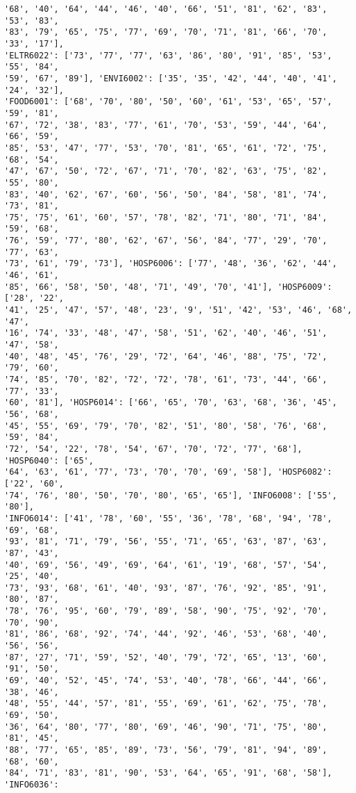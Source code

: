 \documentclass[11pt]{article}
\begin{document}
\begin{Verbatim}[commandchars=\\\{\}]
'68', '40', '64', '44', '46', '40', '66', '51', '81', '62', '83', '53', '83',
'83', '79', '65', '75', '77', '69', '70', '71', '81', '66', '70', '33', '17'],
'ELTR6022': ['73', '77', '77', '63', '86', '80', '91', '85', '53', '55', '84',
'59', '67', '89'], 'ENVI6002': ['35', '35', '42', '44', '40', '41', '24', '32'],
'FOOD6001': ['68', '70', '80', '50', '60', '61', '53', '65', '57', '59', '81',
'67', '72', '38', '83', '77', '61', '70', '53', '59', '44', '64', '66', '59',
'85', '53', '47', '77', '53', '70', '81', '65', '61', '72', '75', '68', '54',
'47', '67', '50', '72', '67', '71', '70', '82', '63', '75', '82', '55', '80',
'83', '40', '62', '67', '60', '56', '50', '84', '58', '81', '74', '73', '81',
'75', '75', '61', '60', '57', '78', '82', '71', '80', '71', '84', '59', '68',
'76', '59', '77', '80', '62', '67', '56', '84', '77', '29', '70', '77', '63',
'73', '61', '79', '73'], 'HOSP6006': ['77', '48', '36', '62', '44', '46', '61',
'85', '66', '58', '50', '48', '71', '49', '70', '41'], 'HOSP6009': ['28', '22',
'41', '25', '47', '57', '48', '23', '9', '51', '42', '53', '46', '68', '47',
'16', '74', '33', '48', '47', '58', '51', '62', '40', '46', '51', '47', '58',
'40', '48', '45', '76', '29', '72', '64', '46', '88', '75', '72', '79', '60',
'74', '85', '70', '82', '72', '72', '78', '61', '73', '44', '66', '77', '33',
'60', '81'], 'HOSP6014': ['66', '65', '70', '63', '68', '36', '45', '56', '68',
'45', '55', '69', '79', '70', '82', '51', '80', '58', '76', '68', '59', '84',
'72', '54', '22', '78', '54', '67', '70', '72', '77', '68'], 'HOSP6040': ['65',
'64', '63', '61', '77', '73', '70', '70', '69', '58'], 'HOSP6082': ['22', '60',
'74', '76', '80', '50', '70', '80', '65', '65'], 'INFO6008': ['55', '80'],
'INFO6014': ['41', '78', '60', '55', '36', '78', '68', '94', '78', '69', '68',
'93', '81', '71', '79', '56', '55', '71', '65', '63', '87', '63', '87', '43',
'40', '69', '56', '49', '69', '64', '61', '19', '68', '57', '54', '25', '40',
'73', '93', '68', '61', '40', '93', '87', '76', '92', '85', '91', '80', '87',
'78', '76', '95', '60', '79', '89', '58', '90', '75', '92', '70', '70', '90',
'81', '86', '68', '92', '74', '44', '92', '46', '53', '68', '40', '56', '56',
'87', '27', '71', '59', '52', '40', '79', '72', '65', '13', '60', '91', '50',
'69', '40', '52', '45', '74', '53', '40', '78', '66', '44', '66', '38', '46',
'48', '55', '44', '57', '81', '55', '69', '61', '62', '75', '78', '69', '50',
'36', '64', '80', '77', '80', '69', '46', '90', '71', '75', '80', '81', '45',
'88', '77', '65', '85', '89', '73', '56', '79', '81', '94', '89', '68', '60',
'84', '71', '83', '81', '90', '53', '64', '65', '91', '68', '58'], 'INFO6036':

\end{Verbatim}
\end{document}
